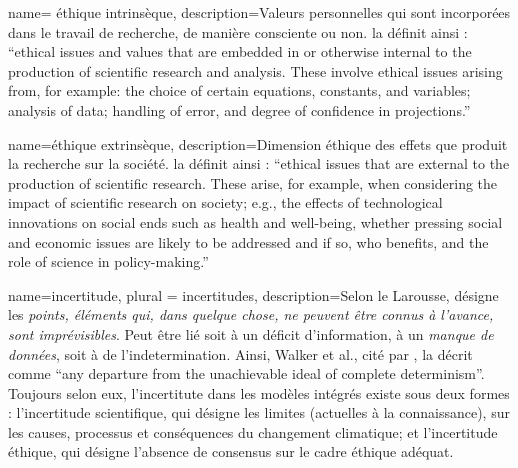 {
    name= éthique intrinsèque, 
    description={Valeurs personnelles qui sont incorporées dans le travail de recherche, de manière consciente ou non. \cite{tuana_leading_2010} la définit ainsi : \enquote{ethical issues and values that are embedded in or otherwise internal to the production of scientific research and analysis. These involve ethical issues arising from, for example: the choice of certain equations, constants, and variables; analysis of data; handling of error, and degree of confidence in projections.}}
}

{
    name=éthique extrinsèque, 
    description={Dimension éthique des effets que produit la recherche sur la société. \cite{tuana_leading_2010} la définit ainsi : \enquote{ethical issues that are external to the production of scientific research. These arise, for example, when considering the impact of scientific research on society; e.g., the effects of technological innovations on social ends such as health and well-being, whether pressing social and economic issues are likely to be addressed and if so, who benefits, and the role of science in policy-making.}}
}

{
    name=incertitude, 
    plural = incertitudes, 
    description={Selon le Larousse, désigne les \emph{points, éléments qui, dans quelque chose, ne peuvent être connus à l'avance, sont imprévisibles}. Peut être lié soit à un déficit d'information, à un \emph{manque de données}, soit à de l'indetermination. Ainsi, Walker et al., cité par \cite{beck_epistemic_2016}, la décrit comme \enquote{any departure from the unachievable ideal of complete determinism}. Toujours selon eux, l'incertitute dans les modèles intégrés existe sous deux formes : l'incertitude scientifique, qui désigne les limites (actuelles à la connaissance), sur les causes, processus et conséquences du changement climatique; et l'incertitude éthique, qui désigne l'absence de consensus sur le cadre éthique adéquat.}
}











